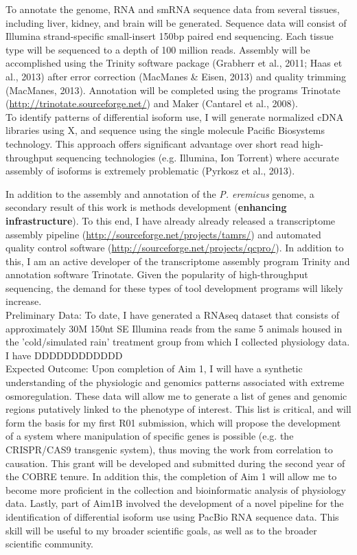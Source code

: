 \documentclass[11pt]{article}
\begin{document}
To annotate the genome, RNA and smRNA sequence data from several tissues, including liver, kidney, and brain will be generated. Sequence data will consist of Illumina strand-specific small-insert 150bp paired end sequencing. Each tissue type will be sequenced to a depth of 100 million reads. Assembly will be accomplished using the Trinity software package (Grabherr et al., 2011; Haas et al., 2013) after error correction (MacManes & Eisen, 2013) and quality trimming (MacManes, 2013). Annotation will be completed using the programs Trinotate (\url{http://trinotate.sourceforge.net/}) and Maker (Cantarel et al., 2008). \\

To identify patterns of differential isoform use, I will generate normalized cDNA libraries using X, and sequence using the single molecule Pacific Biosystems technology. This approach offers significant advantage over short read high-throughput sequencing technologies (e.g. Illumina, Ion Torrent) where accurate assembly of isoforms is extremely problematic (Pyrkosz et al., 2013).


In addition to the assembly and annotation of the \textit{P. eremicus} genome, a secondary result of this work is methods development (\textbf{enhancing infrastructure}). To this end, I have already already released a transcriptome assembly pipeline (\url{http://sourceforge.net/projects/tamrs/}) and automated quality control software (\url{http://sourceforge.net/projects/qcpro/}). In addition to this, I am an active developer of the transcriptome assembly program Trinity and annotation software Trinotate. Given the popularity of high-throughput sequencing, the demand for these types of tool development programs will likely increase. \\

Preliminary Data: To date, I have generated a RNAseq dataset that consists of approximately 30M 150nt SE Illumina reads from the same 5 animals housed in the 'cold/simulated rain' treatment group from which I collected physiology data. I have DDDDDDDDDDDD \\

Expected Outcome: Upon completion of Aim 1, I will have a synthetic understanding of the physiologic and genomics patterns associated with extreme osmoregulation. These data will allow me to generate a list of genes and genomic regions putatively linked to the phenotype of interest. This list is critical, and will form the basis for my first R01 submission, which will propose the development of a system where manipulation of specific genes is possible (e.g. the CRISPR/CAS9 transgenic system), thus moving the work from correlation to causation. This grant will be developed and submitted during the second year of the COBRE tenure. In addition this, the completion of Aim 1 will allow me to become more proficient in the collection and bioinformatic analysis of physiology data. Lastly, part of Aim1B involved the development of a novel pipeline for the identification of differential isoform use using PacBio RNA sequence data. This skill will be useful to my broader scientific goals, as well as to the broader scientific community.    \\
\end{document}
